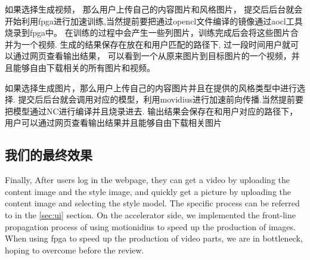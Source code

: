 如果选择生成视频， 那么用户上传自己的内容图片和风格图片，
提交后后台就会开始利用fpga进行加速训练,当然提前要把通过opencl文件编译的镜像通过aocl工具烧录到fpga中。
在训练的过程中会产生一些列图片，训练完成后会将这些图片合并为一个视频.
生成的结果保存在放在和用户匹配的路径下, 过一段时间用户就可以通过网页查看输出结果，
可以看到一个从原来图片到目标图片的一个视频，并且能够自由下载相关的所有图片和视频。

如果选择生成图片，那么用户上传自己的内容图片并且在提供的风格类型中进行选择.
提交后后台就会调用对应的模型，利用movidius进行加速前向传播.当然提前要把模型通过NC进行编译并且烧录进去.
输出结果会保存在和用户对应的路径下，用户可以通过网页查看输出结果并且能够自由下载相关图片

\subsection{我们的最终效果}
Finally, After users log in the webpage, they can get a video by uploading the content image and the style image, and quickly get a picture by uploading the content image and selecting the style model.
The specific process can be referred to in the \ref{sec:ui} section.
On the accelerator side, we implemented the front-line propagation process of using motionidius to speed up the production of images.
When using fpga to speed up the production of video parts, we are in bottleneck, hoping to overcome before the review.
